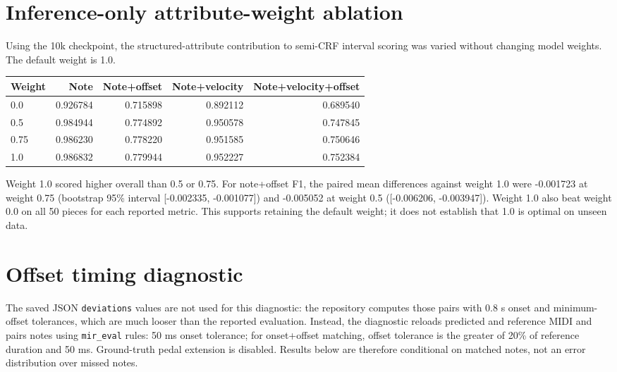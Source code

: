 \documentclass[11pt]{article}
\begin{document}
\section{Inference-only attribute-weight ablation}

Using the 10k checkpoint, the structured-attribute contribution to
semi-CRF interval scoring was varied without changing model weights. The
default weight is 1.0.

\begin{center}
\begin{tabular}{lrrrr}
\toprule
\textbf{Weight} & \textbf{Note} & \textbf{Note+offset} &
\textbf{Note+velocity} & \textbf{Note+velocity+offset} \\
\midrule
0.0  & 0.926784 & 0.715898 & 0.892112 & 0.689540 \\
0.5  & 0.984944 & 0.774892 & 0.950578 & 0.747845 \\
0.75 & 0.986230 & 0.778220 & 0.951585 & 0.750646 \\
1.0  & 0.986832 & 0.779944 & 0.952227 & 0.752384 \\
\bottomrule
\end{tabular}
\end{center}

Weight 1.0 scored higher overall than 0.5 or 0.75. For note+offset F1, the
paired mean differences against weight 1.0 were -0.001723 at weight 0.75
(bootstrap 95\% interval [-0.002335, -0.001077]) and -0.005052 at weight
0.5 ([-0.006206, -0.003947]). Weight 1.0 also beat weight 0.0 on all 50
pieces for each reported metric. This supports retaining the default weight;
it does not establish that 1.0 is optimal on unseen data.

\section{Offset timing diagnostic}

The saved JSON \texttt{deviations} values are not used for this diagnostic:
the repository computes those pairs with 0.8 s onset and minimum-offset
tolerances, which are much looser than the reported evaluation. Instead, the
diagnostic reloads predicted and reference MIDI and pairs notes using
\texttt{mir\_eval} rules: 50 ms onset tolerance; for onset+offset matching,
offset tolerance is the greater of 20\% of reference duration and 50 ms.
Ground-truth pedal extension is disabled. Results below are therefore
conditional on matched notes, not an error distribution over missed notes.
\end{document}
